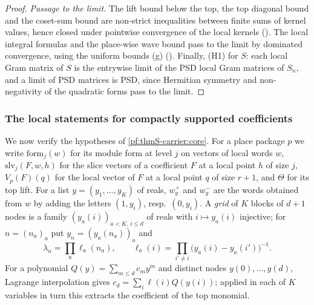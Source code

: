 \begin{proof}
\emph{Passage to the limit.} The lift bound below the top, the top diagonal bound and the coset-sum bound are non-strict
inequalities between finite sums of kernel values, hence closed under pointwise convergence of the local kernels
(). The local integral formulas and the place-wise wave bound pass to
the limit by dominated convergence, using the uniform bounds (g)
(). Finally, (H1) for $S$: each local Gram matrix of
$S$ is the entrywise limit of the PSD local Gram matrices of $S_n$, and a limit of PSD matrices is PSD, since Hermitian symmetry
and non-negativity of the quadratic forms pass to the limit.
\end{proof}

\subsubsection{The local statements for compactly supported coefficients}\label{sec:pf:thmS-carrier:leaves}

We now verify the hypotheses of \cref{pf:thmS-carrier:core}. For a place package $p$ we write $\mathrm{form}_j(w)$ for its
module form at level $j$ on vectors of local words $w$, $\mathrm{slv}_j(F,w,h)$ for the slice vectors of a coefficient $F$
at a local point $h$ of size $j$, $V_p(F)(q)$ for the local vector of $F$ at a local point $q$ of size $r+1$, and $\Theta$ for
its top lift. For a list $y=(y_1,\dots,y_K)$ of reals, $w^+_y$ and $w^-_y$ are the words obtained from $w$ by adding the letters
$(1,y_i)$, resp.\ $(0,y_i)$. A \emph{grid} of $K$ blocks of $d+1$ nodes is a family $(y_a(i))_{a<K,\,i\le d}$ of reals with
$i\mapsto y_a(i)$ injective; for $n=(n_a)_a$ put $y_n=(y_a(n_a))_a$ and
\[
\lambda_n=\prod_a\ell_a(n_a),\qquad\ell_a(i)=\prod_{i'\ne i}\bigl(y_a(i)-y_a(i')\bigr)^{-1}.
\]
For a polynomial $Q(y)=\sum_{m\le d}c_my^m$ and distinct nodes $y(0),\dots,y(d)$, Lagrange interpolation gives
$c_d=\sum_i\ell(i)Q(y(i))$; applied in each of $K$ variables in turn this extracts the coefficient of the top monomial.

